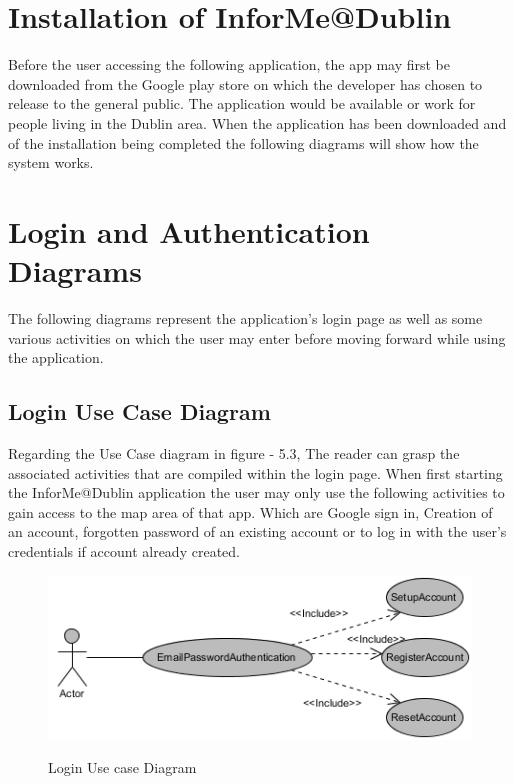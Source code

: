 \section{Installation of InforMe@Dublin}
Before the user accessing the following application, the app may first be downloaded from the Google play store on which the developer has chosen to release to the general public. The application would be available or work for people living in the Dublin area. When the application has been downloaded and of the installation being completed the following diagrams will show how the system works.

\section{Login and Authentication Diagrams}
The following diagrams represent the application's login page as well as some various activities on which the user may enter before moving forward while using the application.

\subsection{Login Use Case Diagram}
Regarding the Use Case diagram in figure - 5.3, The reader can grasp the associated activities that are compiled within the login page. When first starting the InforMe@Dublin application the user may only use the following activities to gain access to the map area of that app. Which are Google sign in, Creation of an account, forgotten password of an existing account or to log in with the user's credentials if account already created.\par

\begin{figure}[htbp]
    \center \includegraphics[width=450pt]{EmailAndPasswordUsecase}\\
    \caption{Login Use case Diagram} \label{Figure: Login Use case Diagram}
\end{figure}

